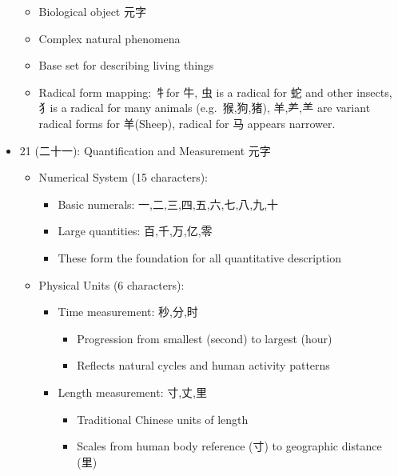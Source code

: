 \documentclass[
]{article}
\providecommand{\tightlist}{%
  \setlength{\itemsep}{0pt}\setlength{\parskip}{0pt}}
\begin{document}
\begin{itemize}
  \begin{itemize}
  \tightlist
  \item
    Biological object 元字
  \item
    Complex natural phenomena
  \item
    Base set for describing living things
  \item
    Radical form mapping: 牜for 牛, 虫 is a radical for 蛇 and other
    insects, 犭is a radical for many animals (e.g.~猴,狗,猪), 羊,⺶,⺷
    are variant radical forms for 羊(Sheep), radical for 马 appears
    narrower.
  \end{itemize}
\item
  21 (二十一): Quantification and Measurement 元字

  \begin{itemize}
  \tightlist
  \item
    Numerical System (15 characters):

    \begin{itemize}
    \tightlist
    \item
      Basic numerals: 一,二,三,四,五,六,七,八,九,十
    \item
      Large quantities: 百,千,万,亿,零
    \item
      These form the foundation for all quantitative description
    \end{itemize}
  \item
    Physical Units (6 characters):

    \begin{itemize}
    \tightlist
    \item
      Time measurement: 秒,分,时

      \begin{itemize}
      \tightlist
      \item
        Progression from smallest (second) to largest (hour)
      \item
        Reflects natural cycles and human activity patterns
      \end{itemize}
    \item
      Length measurement: 寸,丈,里

      \begin{itemize}
      \tightlist
      \item
        Traditional Chinese units of length
      \item
        Scales from human body reference (寸) to geographic distance
        (里)
      \end{itemize}
    \end{itemize}
  \end{itemize}
\end{itemize}
\end{document}
